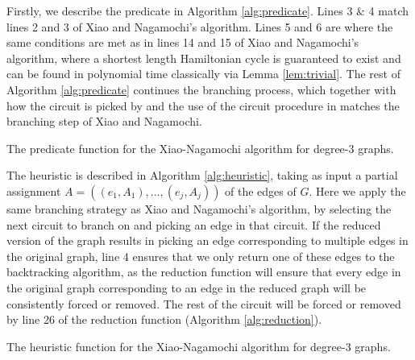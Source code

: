 Firstly, we describe the predicate in Algorithm \ref{alg:predicate}. Lines 3 \& 4 match lines 2 and 3 of Xiao and Nagamochi's algorithm. Lines 5 and 6 are where the same conditions are met as in lines 14 and 15 of Xiao and Nagamochi's algorithm, where a shortest length Hamiltonian cycle is guaranteed to exist and can be found in polynomial time classically via Lemma \ref{lem:trivial}. The rest of Algorithm \ref{alg:predicate} continues the branching process, which together with how the circuit is picked by \FnHeuristicthree and the use of the circuit procedure in \FnReductionthree matches the branching step of Xiao and Nagamochi.

\begin{algorithm}
\caption{\label{alg:predicate} The predicate function for the Xiao-Nagamochi algorithm for degree-3 graphs.}
\end{algorithm}

The heuristic is described in Algorithm \ref{alg:heuristic}, taking as input a partial assignment $A = ((e_1, A_1),\dots,(e_j, A_j))$ of the edges of $G$. Here we apply the same branching strategy as Xiao and Nagamochi's algorithm, by selecting the next circuit to branch on and picking an edge in that circuit. If the reduced version of the graph results in \FnHeuristicthree picking an edge corresponding to multiple edges in the original graph, line 4 ensures that we only return one of these edges to the backtracking algorithm, as the reduction function will ensure that every edge in the original graph corresponding to an edge in the reduced graph will be consistently forced or removed. The rest of the circuit will be forced or removed by line 26 of the reduction function (Algorithm \ref{alg:reduction}).

\begin{algorithm}
\caption{\label{alg:heuristic} The heuristic function for the Xiao-Nagamochi algorithm for degree-3 graphs.}
\end{algorithm}


